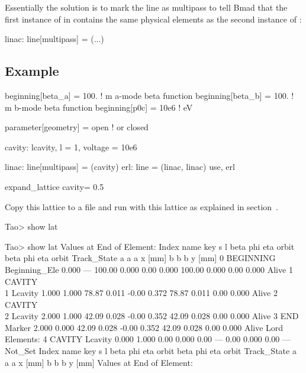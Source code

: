 \documentclass{hitec}
\begin{document}
Essentially the solution is to mark the  line as multipass to tell Bmad that the first instance of  in 
contains the same physical elements as the second instance of :
{\small
\begin{code}
linac: line[multipass] = (...)
\end{code}}

\subsection{Example}

{\small
\begin{code}
beginning[beta_a] = 100.   ! m  a-mode beta function
beginning[beta_b] = 100.   ! m  b-mode beta function
beginning[p0c] = 10e6   ! eV   

parameter[geometry] = open      ! or closed

cavity: lcavity, l = 1, voltage = 10e6

linac: line[multipass] = (cavity)
erl: line = (linac, linac) 
use, erl

expand_lattice                
cavity = 0.5
\end{code}}

Copy this lattice to a file and run \tao with this lattice as explained in
section~. 


{\small
\begin{code}
Tao> show lat

Tao> show lat
      Values at End of Element:
 Index  name      key                       s       l    beta     phi    eta  orbit     beta     phi    eta  orbit    Track_State
                                                            a       a      a  x [mm]       b       b      b  y [mm]
     0  BEGINNING Beginning_Ele         0.000     ---  100.00   0.000   0.00   0.000  100.00   0.000   0.00   0.000   Alive
     1  CAVITY\\1  Lcavity               1.000   1.000   78.87   0.011  -0.00   0.372   78.87   0.011   0.00   0.000   Alive
     2  CAVITY\\2  Lcavity               2.000   1.000   42.09   0.028  -0.00   0.352   42.09   0.028   0.00   0.000   Alive
     3  END       Marker                2.000   0.000   42.09   0.028  -0.00   0.352   42.09   0.028   0.00   0.000   Alive
Lord Elements:
     4  CAVITY    Lcavity               0.000   1.000    0.00   0.000   0.00     ---    0.00   0.000   0.00     ---   Not_Set
 Index  name      key                       s       l    beta     phi    eta  orbit     beta     phi    eta  orbit    Track_State
                                                        a       a      a  x [mm]       b       b      b  y [mm]
  Values at End of Element:
\end{code}}
\end{document}
